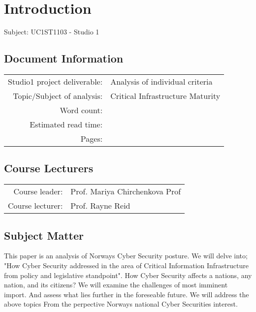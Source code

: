 \section{Introduction}

{\huge{Subject: UC1ST1103 - Studio 1}}

\subsection{Document Information}

\begin{table}[h]
    \renewcommand{\arraystretch}{2}
    \begin{tabular}{r|l}
        Studio1 project deliverable: & Analysis of individual criteria \\
        Topic/Subject of analysis: & Critical Infrastructure Maturity\\
        Word count: & {\color{red}{N/A}}\\
        Estimated read time: & {\color{red}{HH:MM}} \\
        Pages: & \pageref{LastPage} \\
    \end{tabular}
    \renewcommand{\arraystretch}{1}
    
    \subsection{Course Lecturers}
    
    \renewcommand{\arraystretch}{2}
    \begin{tabular}{r|l}
        Course leader: & Prof. Mariya Chirchenkova Prof \\
        Course lecturer: & Prof. Rayne Reid \\
    \end{tabular}
    \renewcommand{\arraystretch}{1}
        
\end{table}

\subsection{Subject Matter}

This paper is an analysis of Norways Cyber Security posture. We will delve into; "How Cyber Security addressed in the area of Critical Information Infrastructure from policy and legislative standpoint". How Cyber Security affects a nations, any nation, and its citizens? We will examine the challenges of most imminent import. And assess what lies further in the foreseable future. We will address the above topics From the perpective Norways national Cyber Securities interest.

